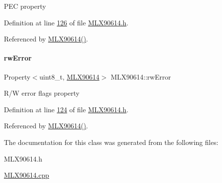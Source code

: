 P\+EC property 

Definition at line \mbox{\hyperlink{_m_l_x90614_8h_source_l00126}{126}} of file \mbox{\hyperlink{_m_l_x90614_8h_source}{M\+L\+X90614.\+h}}.



Referenced by \mbox{\hyperlink{_m_l_x90614_8cpp_source_l00046}{M\+L\+X90614()}}.

\mbox{\label{class_m_l_x90614_a13d10b57b4369c27e740585bf3907b0e}} 
\paragraph{\texorpdfstring{rw\+Error}{rwError}}
{\footnotesize\ttfamily Property$<$uint8\+\_\+t, \mbox{\hyperlink{class_m_l_x90614}{M\+L\+X90614}}$>$ M\+L\+X90614\+::rw\+Error}

R/W error flags property 

Definition at line \mbox{\hyperlink{_m_l_x90614_8h_source_l00124}{124}} of file \mbox{\hyperlink{_m_l_x90614_8h_source}{M\+L\+X90614.\+h}}.



Referenced by \mbox{\hyperlink{_m_l_x90614_8cpp_source_l00046}{M\+L\+X90614()}}.



The documentation for this class was generated from the following files\+:\begin{DoxyCompactItemize}
\item 
M\+L\+X90614.\+h\item 
\mbox{\hyperlink{_m_l_x90614_8cpp}{M\+L\+X90614.\+cpp}}\end{DoxyCompactItemize}
